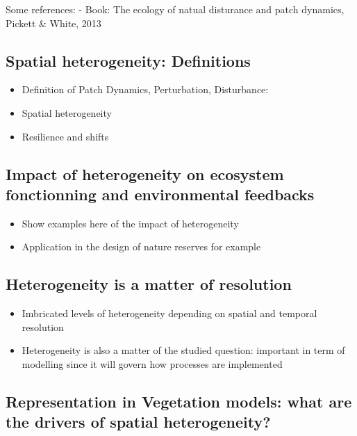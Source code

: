 \documentclass[
  oneside]{book}
\providecommand{\tightlist}{%
  \setlength{\itemsep}{0pt}\setlength{\parskip}{0pt}}
\begin{document}
Some references:
- Book: The ecology of natual disturance and patch dynamics, Pickett \& White, 2013

\hypertarget{spatial-heterogeneity-definitions}{%
\subsection{Spatial heterogeneity: Definitions}\label{spatial-heterogeneity-definitions}}

\begin{itemize}
\tightlist
\item
  Definition of Patch Dynamics, Perturbation, Disturbance:
\item
  Spatial heterogeneity
\item
  Resilience and shifts
\end{itemize}

\hypertarget{impact-of-heterogeneity-on-ecosystem-fonctionning-and-environmental-feedbacks}{%
\subsection{Impact of heterogeneity on ecosystem fonctionning and environmental feedbacks}\label{impact-of-heterogeneity-on-ecosystem-fonctionning-and-environmental-feedbacks}}

\begin{itemize}
\tightlist
\item
  Show examples here of the impact of heterogeneity
\item
  Application in the design of nature reserves for example
\end{itemize}

\hypertarget{heterogeneity-is-a-matter-of-resolution}{%
\subsection{Heterogeneity is a matter of resolution}\label{heterogeneity-is-a-matter-of-resolution}}

\begin{itemize}
\tightlist
\item
  Imbricated levels of heterogeneity depending on spatial and temporal resolution
\item
  Heterogeneity is also a matter of the studied question: important in term of modelling since it will govern how processes are implemented
\end{itemize}

\hypertarget{representation-in-vegetation-models-what-are-the-drivers-of-spatial-heterogeneity}{%
\subsection{Representation in Vegetation models: what are the drivers of spatial heterogeneity?}\label{representation-in-vegetation-models-what-are-the-drivers-of-spatial-heterogeneity}}
\end{document}
